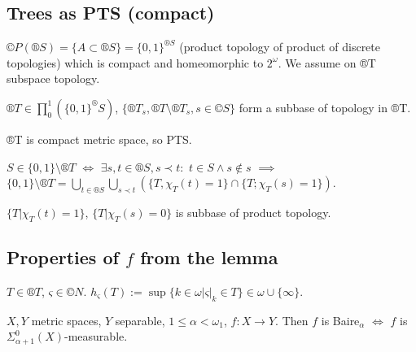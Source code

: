 \documentclass[12pt]{article}					%
\begin{document}
\subsection{Trees as PTS (compact)}
\begin{poznamka}
	$©P(®S) = \{A \subset ®S\} = \{0, 1\}^{®S}$ (product topology of product of discrete topologies) which is compact and homeomorphic to $2^ω$. We assume on ®T subspace topology.
\end{poznamka}

\begin{tvrzeni}
	$®T \in ∏_0^1(\{0, 1\}^®S)$, $\{®T_s, ®T \setminus ®T_s, s \in ©S\}$ form a subbase of topology in ®T.

	\begin{poznamkain}
		®T is compact metric space, so PTS.
	\end{poznamkain}

	\begin{dukazin}
		$S \in \{0, 1\} \setminus ®T$ $\Leftrightarrow$ $\exists s, t \in ®S, s \prec t:$ $t \in S \land s \notin s$ $\implies$ $\{0, 1\} \setminus ®T = \bigcup_{t \in ®S} \bigcup_{s \prec t} (\{T, χ_T(t) = 1\} \cap \{T; χ_T(s) = 1\})$.

		$\{T | χ_T(t) = 1\}$, $\{T | χ_T(s) = 0\}$ is subbase of product topology.
	\end{dukazin}
\end{tvrzeni}

\subsection{Properties of $f$ from the lemma}
\begin{definice}
	$T \in ®T$, $ς \in ©N$. $h_ς(T) := \sup\{k \in ω | ς|_k \in T\} \in ω \cup \{∞\}$.
\end{definice}

\begin{poznmka}
	$X, Y$ metric spaces, $Y$ separable, $1 ≤ α < ω_1$, $f: X \rightarrow Y$. Then $f$ is Baire$_α$ $\Leftrightarrow$ $f$ is $Σ_{α + 1}^0(X)$-measurable.
\end{poznmka}
\end{document}
